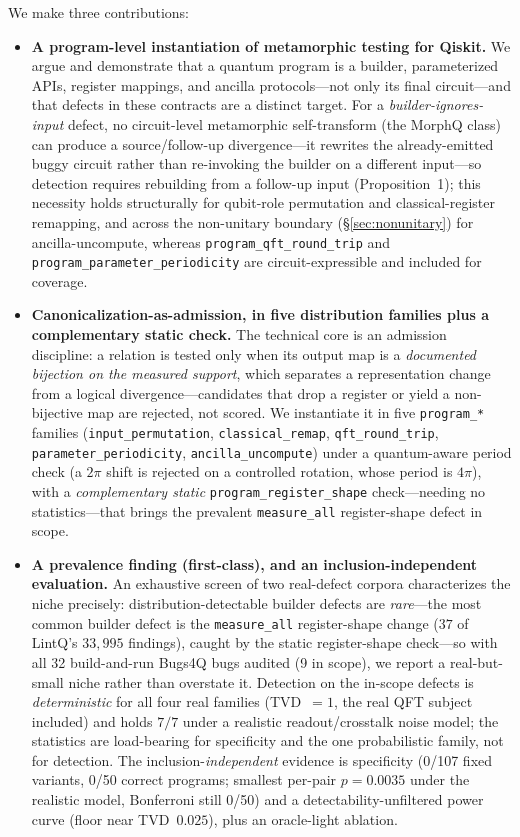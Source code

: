 We make three contributions:
\begin{itemize}
  \item \textbf{A program-level instantiation of metamorphic testing for Qiskit.} We argue and demonstrate that a quantum program is a builder, parameterized APIs, register mappings, and ancilla protocols---not only its final circuit---and that defects in these contracts are a distinct target. For a \emph{builder-ignores-input} defect, no circuit-level metamorphic self-transform (the MorphQ class) can produce a source/follow-up divergence---it rewrites the already-emitted buggy circuit rather than re-invoking the builder on a different input---so detection requires rebuilding from a follow-up input (Proposition~1); this necessity holds structurally for qubit-role permutation and classical-register remapping, and across the non-unitary boundary (\S\ref{sec:nonunitary}) for ancilla-uncompute, whereas \texttt{program\_qft\_round\_trip} and \texttt{program\_parameter\_periodicity} are circuit-expressible and included for coverage.
  \item \textbf{Canonicalization-as-admission, in five distribution families plus a complementary static check.} The technical core is an admission discipline: a relation is tested only when its output map is a \emph{documented bijection on the measured support}, which separates a representation change from a logical divergence---candidates that drop a register or yield a non-bijective map are rejected, not scored. We instantiate it in five \texttt{program\_*} families (\texttt{input\_permutation}, \texttt{classical\_remap}, \texttt{qft\_round\_trip}, \texttt{parameter\_periodicity}, \texttt{ancilla\_uncompute}) under a quantum-aware period check (a $2\pi$ shift is rejected on a controlled rotation, whose period is $4\pi$), with a \emph{complementary static} \texttt{program\_register\_shape} check---needing no statistics---that brings the prevalent \texttt{measure\_all} register-shape defect in scope.
  \item \textbf{A prevalence finding (first-class), and an inclusion-independent evaluation.} An exhaustive screen of two real-defect corpora characterizes the niche precisely: distribution-detectable builder defects are \emph{rare}---the most common builder defect is the \texttt{measure\_all} register-shape change ($37$ of LintQ's $33{,}995$ findings), caught by the static register-shape check---so with all 32 build-and-run Bugs4Q bugs audited (9 in scope), we report a real-but-small niche rather than overstate it. Detection on the in-scope defects is \emph{deterministic} for all four real families (TVD~$=1$, the real QFT subject included) and holds $7/7$ under a realistic readout/crosstalk noise model; the statistics are load-bearing for specificity and the one probabilistic family, not for detection. The inclusion-\emph{independent} evidence is specificity (0/107 fixed variants, 0/50 correct programs; smallest per-pair $p=0.0035$ under the realistic model, Bonferroni still 0/50) and a detectability-unfiltered power curve (floor near TVD~$0.025$), plus an oracle-light ablation.
\end{itemize}
